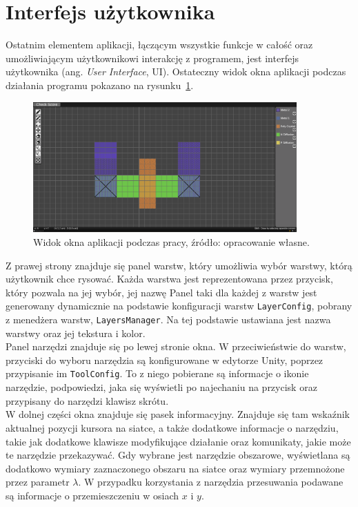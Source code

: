 \section{Interfejs użytkownika}
\label{sec:interfejs_uzytkownika}

Ostatnim elementem aplikacji,
łączącym wszystkie funkcje w całość oraz umożliwiającym użytkownikowi interakcję z programem,
jest interfejs użytkownika (ang. \textit{User Interface}, UI).
Ostateczny widok okna aplikacji podczas działania programu pokazano na rysunku~\ref{fig:ui_final}.

\begin{figure}[H]
    \centering
    \includegraphics[width=0.9\textwidth]{chapters/chapter4/rys/final_ui}
    \caption[Widok okna aplikacji podczas pracy.]
    {Widok okna aplikacji podczas pracy, źródło: opracowanie własne.}
    \label{fig:ui_final}
\end{figure}

Z prawej strony znajduje się panel warstw, który umożliwia wybór warstwy, którą użytkownik chce rysować.
Każda warstwa jest reprezentowana przez przycisk, który pozwala na jej wybór, jej nazwę
Panel taki dla każdej z warstw jest generowany dynamicznie na podstawie konfiguracji warstw \texttt{LayerConfig},
pobrany z menedżera warstw, \texttt{LayersManager}.
Na tej podstawie ustawiana jest nazwa warstwy oraz jej tekstura i kolor.\\
\indent Panel narzędzi znajduje się po lewej stronie okna.
W przeciwieństwie do warstw, przyciski do wyboru narzędzia są konfigurowane w edytorze Unity,
poprzez przypisanie im \texttt{ToolConfig}.
To z niego pobierane są informacje o ikonie narzędzie, podpowiedzi, jaka się wyświetli po najechaniu na przycisk
oraz przypisany do narzędzi klawisz skrótu.\\
\indent W dolnej części okna znajduje się pasek informacyjny.
Znajduje się tam wskaźnik aktualnej pozycji kursora na siatce, a także dodatkowe informacje o narzędziu,
takie jak dodatkowe klawisze modyfikujące działanie oraz komunikaty, jakie może te narzędzie przekazywać.
Gdy wybrane jest narzędzie obszarowe,
wyświetlana są dodatkowo wymiary zaznaczonego obszaru na siatce oraz wymiary przemnożone przez parametr $\lambda$.
W przypadku korzystania z narzędzia przesuwania podawane są informacje o przemieszczeniu w osiach $x$ i $y$.
